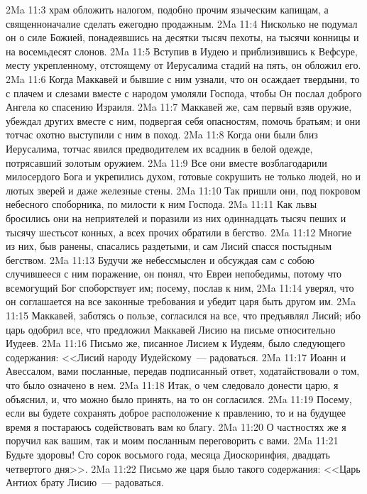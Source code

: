 \vs 2Ma 11:3 храм обложить налогом, подобно прочим языческим капищам, а священноначалие сделать ежегодно продажным.
\vs 2Ma 11:4 Нисколько не подумал он о силе Божией, понадеявшись на десятки тысяч пехоты, на тысячи конницы и на восемьдесят слонов.
\vs 2Ma 11:5 Вступив в Иудею и приблизившись к Вефсуре, месту укрепленному, отстоящему от Иерусалима стадий на пять, он обложил его.
\vs 2Ma 11:6 Когда Маккавей и бывшие с ним узнали, что он осаждает твердыни, то с плачем и слезами вместе с народом умоляли Господа, чтобы Он послал доброго Ангела ко спасению Израиля.
\vs 2Ma 11:7 Маккавей же, сам первый взяв оружие, убеждал других вместе с ним, подвергая себя опасностям, помочь братьям; и они тотчас охотно выступили с ним в поход.
\vs 2Ma 11:8 Когда они были близ Иерусалима, тотчас явился предводителем их всадник в белой одежде, потрясавший золотым оружием.
\vs 2Ma 11:9 Все они вместе возблагодарили милосердого Бога и укрепились духом, готовые сокрушить не только людей, но и лютых зверей и даже железные стены.
\vs 2Ma 11:10 Так пришли они, под покровом небесного споборника, по милости к ним Господа.
\vs 2Ma 11:11 Как львы бросились они на неприятелей и поразили из них одиннадцать тысяч пеших и тысячу шестьсот конных, а всех прочих обратили в бегство.
\vs 2Ma 11:12 Многие из них, быв ранены, спасались раздетыми, и сам Лисий спасся постыдным бегством.
\vs 2Ma 11:13 Будучи же небессмыслен и обсуждая сам с собою случившееся с ним поражение, он понял, что Евреи непобедимы, потому что всемогущий Бог споборствует им; посему, послав к ним,
\vs 2Ma 11:14 уверял, что он соглашается на все законные требования и убедит царя быть другом им.
\vs 2Ma 11:15 Маккавей, заботясь о пользе, согласился на все, что предъявлял Лисий; ибо царь одобрил все, что предложил Маккавей Лисию на письме относительно Иудеев.
\vs 2Ma 11:16 Письмо же, писанное Лисием к Иудеям, было следующего содержания: <<Лисий народу Иудейскому~--- радоваться.
\vs 2Ma 11:17 Иоанн и Авессалом, вами посланные, передав подписанный ответ, ходатайствовали о том, что было означено в нем.
\vs 2Ma 11:18 Итак, о чем следовало донести царю, я объяснил, и, что можно было принять, на то он согласился.
\vs 2Ma 11:19 Посему, если вы будете сохранять доброе расположение к правлению, то и на будущее время я постараюсь содействовать вам ко благу.
\vs 2Ma 11:20 О частностях же я поручил как вашим, так и моим посланным переговорить с вами.
\vs 2Ma 11:21 Будьте здоровы! Сто сорок восьмого года, месяца Диоскоринфия, двадцать четвертого дня>>.
\vs 2Ma 11:22 Письмо же царя было такого содержания: <<Царь Антиох брату Лисию~--- радоваться.
